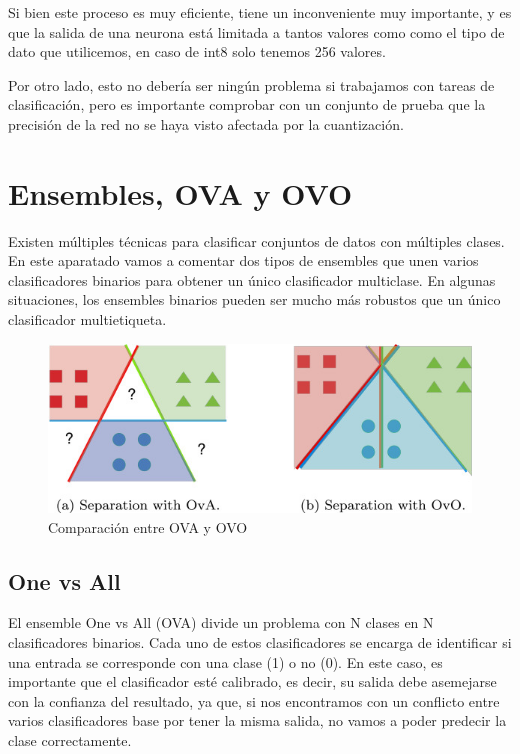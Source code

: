 Si bien este proceso es muy eficiente, tiene un inconveniente muy
importante, y es que la salida de una neurona está limitada a tantos
valores como como el tipo de dato que utilicemos, en caso de int8 solo
tenemos 256 valores.

Por otro lado, esto no debería ser ningún problema si trabajamos con
tareas de clasificación, pero es importante comprobar con un conjunto de
prueba que la precisión de la red no se haya visto afectada por la
cuantización.


\hypertarget{ensembles-ova-y-ovo}{%
\section{Ensembles, OVA y OVO}\label{ensembles-ova-y-ovo}}

Existen múltiples técnicas para clasificar conjuntos de datos con múltiples
clases. En este aparatado vamos a comentar dos tipos de ensembles que
unen varios clasificadores binarios para obtener un único clasificador
multiclase.
En algunas situaciones, los ensembles binarios pueden ser mucho más robustos que un único clasificador multietiqueta. 

\begin{figure}
    \centering
    \includegraphics[]{img/3/ova-ovo.jpg}
    \caption{Comparación entre OVA y OVO}
    \label{fig:ova-ovo}
\end{figure}


\hypertarget{one-vs-all}{%
\subsection{One vs All}\label{one-vs-all}}

El ensemble One vs All (OVA) divide un problema con N clases en N
clasificadores binarios. Cada uno de estos clasificadores se encarga de
identificar si una entrada se corresponde con una clase (1) o no (0). En
este caso, es importante que el clasificador esté calibrado, es decir,
su salida debe asemejarse con la confianza del resultado, ya que, si nos
encontramos con un conflicto entre varios clasificadores base por tener
la misma salida, no vamos a poder predecir la clase correctamente.

